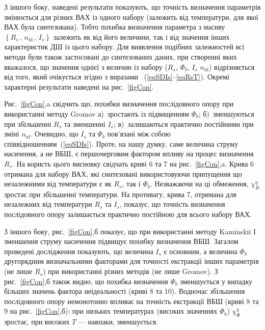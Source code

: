 З іншого боку, наведені результати показують, що точність визначення параметрів змінюється для різних ВАХ із одного набору (залежить від температури, для якої ВАХ була синтезована).
Тобто похибка визначення параметра з масиву $\left\{R_s\,,\,n_\mathrm{id}\,,\, I_s\right\}$ залежить як від його величини, так і від значення інших характеристик ДШ із цього набору.
Для виявлення подібних залежностей всі методи були також застосовані до синтезованих даних, при створенні яких вважалося, що значення однієї з величин із набору ($R_s$, $\Phi_b$, $I_s$ $n_\mathrm{id}$) відрізняється від того, який очікується згідно з виразами ~(\ref{eqSDIs}--\ref{eqRsT}).
Окремі характерні результати наведені на рис.~\ref{figCon}.

Рис.~\ref{figCon},a свідчить що, похибки визначення послідовного опору при використанні методу Gromov
а)~зростають із підвищенням $\Phi_b$;
б)~зменшуються при збільшенні $R_s$ та зменшенні $I_s$;
в)~залишаються практично постійними при зміні $n_\mathrm{id}$.
Очевидно, що $I_s$ та $\Phi_b$ пов'язані між собою співвідношенням~(\ref{eqSDIs}).
Проте, на нашу думку, саме величина струму насичення, а не ВБШ, є першочерговим фактором впливу на процес визначення $R_s$.
На користь цього висновку свідчать криві 6 та 7 на рис.~\ref{figCon},a.
Крива 6 отримана для набору ВАХ, які синтезовані використовуючи припущення що незалежними від температури є як $R_s$, так і $\Phi_b$.
Незважаючи на ці обмеження, $\chi^q_R$ зростає при збільшенні температури.
На противагу, крива 7, отримана для незалежних від температури $R_s$ та $I_s$, показує, що точність визначення послідовного опору залишається практично постійною для всього набору ВАХ.

З іншого боку, рис.~\ref{figCon},б показує, що при використанні методу Kaminskii I зменшення струму насичення підвищує похибку визначення ВБШ.
Загалом проведені дослідження показують, що величина $I_s$ є основним, а величина  $\Phi_b$ другорядним визначальними факторами для точності екстракції інших параметрів (не лише $R_s$) при використанні різних методів (не лише Gromov).
З рис.~\ref{figCon},б також видно, що похибка визначення $\Phi_b$ зменшується у випадку більших значень фактора неідеальності (криві 8 та 10).
Водночас збільшення послідовного опору немонотонно впливає на точність екстракції ВБШ (криві 8 та 9 на рис.~\ref{figCon},б):
при низьких температурах (високих значеннях $\Phi_b$) $\chi^q_{\Phi}$ зростає, при високих $T$ --- навпаки, зменшується.


